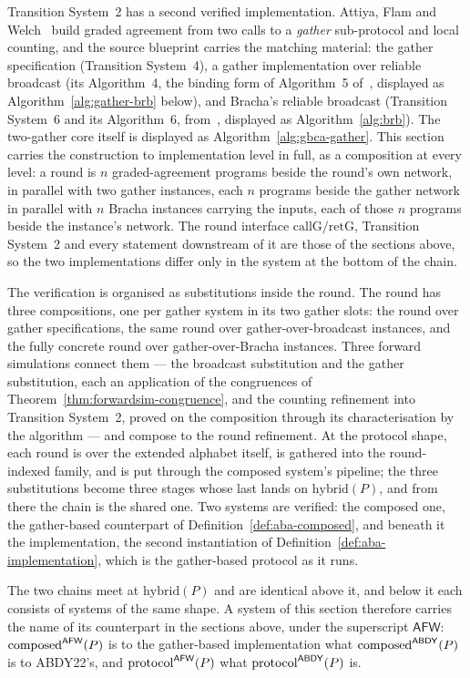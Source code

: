 Transition System~2 has a second verified implementation.
Attiya, Flam and Welch~\cite{AFW25} build graded agreement from two calls to a \emph{gather} sub-protocol and local counting, and the source blueprint carries the matching material: the gather specification (Transition System~4), a gather implementation over reliable broadcast (its Algorithm~4, the binding form of Algorithm~5 of~\cite{AFW25}, displayed as Algorithm~\ref{alg:gather-brb} below), and Bracha's reliable broadcast (Transition System~6 and its Algorithm~6, from~\cite{Bra87}, displayed as Algorithm~\ref{alg:brb}).
The two-gather core itself is displayed as Algorithm~\ref{alg:gbca-gather}.
This section carries the construction to implementation level in full, as a composition at every level: a round is $n$ graded-agreement programs beside the round's own network, in parallel with two gather instances, each $n$ programs beside the gather network in parallel with $n$ Bracha instances carrying the inputs, each of those $n$ programs beside the instance's network.
The round interface $\mathrm{callG}/\mathrm{retG}$, Transition System~2 and every statement downstream of it are those of the sections above, so the two implementations differ only in the system at the bottom of the chain.

The verification is organised as substitutions inside the round.
The round has three compositions, one per gather system in its two gather slots: the round over gather specifications, the same round over gather-over-broadcast instances, and the fully concrete round over gather-over-Bracha instances.
Three forward simulations connect them --- the broadcast substitution and the gather substitution, each an application of the congruences of Theorem~\ref{thm:forwardsim-congruence}, and the counting refinement into Transition System~2, proved on the composition through its characterisation by the algorithm --- and compose to the round refinement.
At the protocol shape, each round is over the extended alphabet itself, is gathered into the round-indexed family, and is put through the composed system's pipeline; the three substitutions become three stages whose last lands on $\mathrm{hybrid}(P)$, and from there the chain is the shared one.
Two systems are verified: the composed one, the gather-based counterpart of Definition~\ref{def:aba-composed}, and beneath it the implementation, the second instantiation of Definition~\ref{def:aba-implementation}, which is the gather-based protocol as it runs.

The two chains meet at $\mathrm{hybrid}(P)$ and are identical above it, and below it each consists of systems of the same shape.
A system of this section therefore carries the name of its counterpart in the sections above, under the superscript $\mathsf{AFW}$: $\mathrm{composed}^{\mathsf{AFW}}(P)$ is to the gather-based implementation what $\mathrm{composed}^{\mathsf{ABDY}}(P)$ is to ABDY22's, and $\mathrm{protocol}^{\mathsf{AFW}}(P)$ what $\mathrm{protocol}^{\mathsf{ABDY}}(P)$ is.

